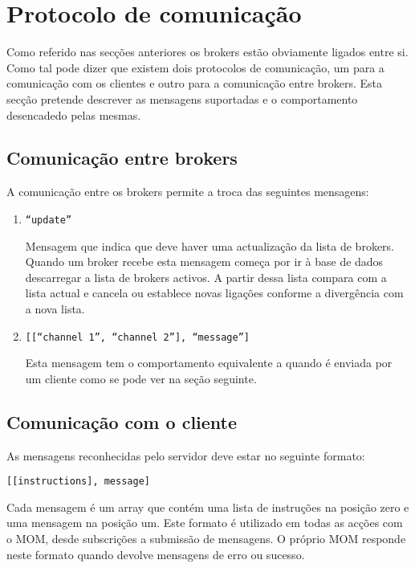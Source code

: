\section{Protocolo de comunicação}
\label{sec:protocolo}

Como referido nas secções anteriores os brokers estão obviamente ligados entre si. Como tal pode dizer que existem dois protocolos de comunicação, um para a comunicação com os clientes e outro para a comunicação entre brokers. Esta secção pretende descrever as mensagens suportadas e o comportamento desencadedo pelas mesmas.

\subsection{Comunicação entre brokers}
A comunicação entre os brokers permite a troca das seguintes mensagens:
\begin{enumerate}
  \item 
  \texttt{``update''}

  Mensagem que indica que deve haver uma actualização da lista de brokers. Quando um broker recebe esta mensagem começa por ir à base de dados descarregar a lista de brokers activos. A partir dessa lista compara com a lista actual e cancela ou establece novas ligações conforme a divergência com a nova lista.

  \item
  \texttt{[[``channel 1'', ``channel 2''], ``message'']}

  Esta mensagem tem o comportamento equivalente a quando é enviada por um cliente como se pode ver na seção seguinte.
\end{enumerate}


\subsection{Comunicação com o cliente}
As mensagens reconhecidas pelo servidor deve estar no seguinte formato:

\begin{center}
  \texttt{[[instructions], message]}
\end{center}

Cada mensagem é um array que contém uma lista de instruções na posição zero e uma mensagem na posição um. Este formato é utilizado em todas as acções com o MOM, desde subscrições a submissão de mensagens. O próprio MOM responde neste formato quando devolve mensagens de erro ou sucesso.

